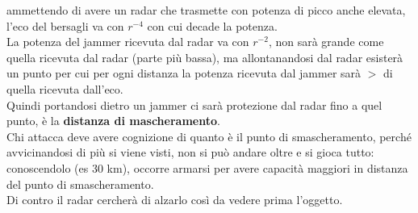 \documentclass[oneside, 12pt]{extbook}
\begin{document}
ammettendo di avere un radar che trasmette con potenza di picco anche elevata, l'eco del bersagli va con $r^{-4}$ con cui decade la potenza.\\
La potenza del jammer ricevuta dal radar va con $r^{-2}$, non sarà grande come quella ricevuta dal radar (parte più bassa), ma allontanandosi dal radar esisterà un punto per cui per ogni distanza la potenza ricevuta dal jammer sarà $>$ di quella ricevuta dall'eco.\\
Quindi portandosi dietro un jammer ci sarà protezione dal radar fino a quel punto, è la \textbf{distanza di mascheramento}.\\
Chi attacca deve avere cognizione di quanto è il punto di smascheramento, perché avvicinandosi di più si viene visti, non si può andare oltre e si gioca tutto: conoscendolo (es 30 km), occorre armarsi per avere capacità maggiori in distanza del punto di smascheramento.\\
Di contro il radar cercherà di alzarlo così da vedere prima l'oggetto.
\end{document}
